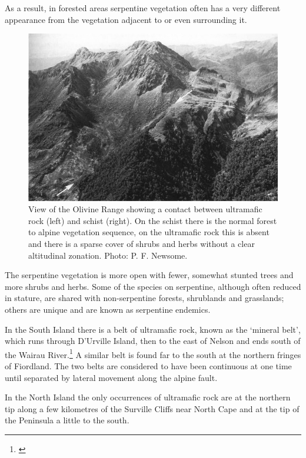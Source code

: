 As a result, in forested areas serpentine vegetation often has a very different appearance from the vegetation adjacent to or even surrounding it.
\begin{figure}[!b]
	\includegraphics[width=\textwidth]{graphics/fig_089}
	\centering
	\caption[View of the Olivine Range]{View of the Olivine Range showing a contact between ultramafic rock (left) and schist (right).
	On the schist there is the normal forest to alpine vegetation sequence, on the ultramafic rock this is absent and there is a sparse cover of shrubs and herbs without a clear altitudinal zonation.
	Photo: P. F. Newsome.}%
	\label{fig:89olivine-range}
\end{figure}
The serpentine vegetation is more open with fewer, somewhat stunted trees and more shrubs and herbs.
Some of the species on serpentine, although often reduced in stature, are shared with non-serpentine forests, shrublands and grasslands; others are unique and are known as serpentine endemics.

In the South Island there is a belt of ultramafic rock, known as the `mineral belt', which runs through D'Urville Island, then to the east of Nelson and ends south of the Wairau River.\footnote{\cite{betts1918notes}}
A similar belt is found far to the south at the northern fringes of Fiordland.
The two belts are considered to have been continuous at one time until separated by lateral movement along the alpine fault.

In the North Island the only occurrences of ultramafic rock are at the northern tip along a few kilometres of the Surville Cliffs near North Cape and at the tip of the Peninsula a little to the south.

